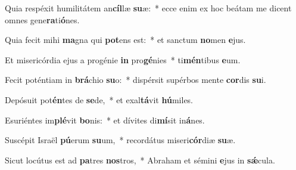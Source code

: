 \item Quia respéxit humilitátem an\textbf{cíl}læ \textbf{su}æ:~* ecce enim ex hoc beátam me dicent omnes gene\textbf{ra}ti\textbf{ó}nes.
\item Quia fecit mihi \textbf{ma}gna qui \textbf{pot}ens est:~* et sanctum \textbf{no}men \textbf{e}jus.
\item Et misericórdia ejus a progénie \textbf{in} pro\textbf{gé}nies~* ti\textbf{mén}tibus \textbf{e}um.
\item Fecit poténtiam in \textbf{brá}chio \textbf{su}o:~* dispérsit supérbos mente \textbf{cor}dis \textbf{su}i.
\item Depósuit pot\textbf{én}tes de \textbf{se}de,~* et exal\textbf{tá}vit \textbf{hú}miles.
\item Esuriéntes im\textbf{plé}vit \textbf{bo}nis:~* et dívites di\textbf{mí}sit in\textbf{á}nes.
\item Suscépit Israël \textbf{pú}erum \textbf{su}um,~* recordátus miseri\textbf{cór}diæ \textbf{su}æ.
\item Sicut locútus est ad \textbf{pa}tres \textbf{nos}tros,~* Abraham et sémini \textbf{e}jus in \textbf{sǽ}cula.
